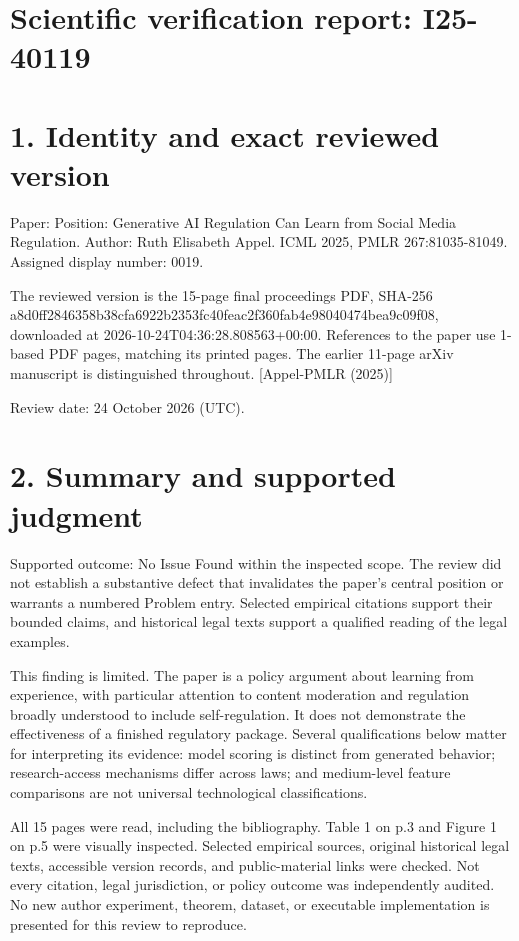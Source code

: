 \documentclass[10pt]{article}
\begin{document}
\section*{Scientific verification report: I25-40119}
\section*{1. Identity and exact reviewed version}
Paper: Position: Generative AI Regulation Can Learn from Social Media Regulation. Author: Ruth Elisabeth Appel. ICML 2025, PMLR 267:81035-81049. Assigned display number: 0019.\par
The reviewed version is the 15-page final proceedings PDF, SHA-256 a8d0ff2846358b38cfa6922b2353fc40feac2f360fab4e98040474bea9c09f08, downloaded at 2026-10-24T04:36:28.808563+00:00. References to the paper use 1-based PDF pages, matching its printed pages. The earlier 11-page arXiv manuscript is distinguished throughout. [Appel-PMLR (2025)]\par
Review date: 24 October 2026 (UTC).\par
\section*{2. Summary and supported judgment}
Supported outcome: No Issue Found within the inspected scope. The review did not establish a substantive defect that invalidates the paper’s central position or warrants a numbered Problem entry. Selected empirical citations support their bounded claims, and historical legal texts support a qualified reading of the legal examples.\par
This finding is limited. The paper is a policy argument about learning from experience, with particular attention to content moderation and regulation broadly understood to include self-regulation. It does not demonstrate the effectiveness of a finished regulatory package. Several qualifications below matter for interpreting its evidence: model scoring is distinct from generated behavior; research-access mechanisms differ across laws; and medium-level feature comparisons are not universal technological classifications.\par
All 15 pages were read, including the bibliography. Table 1 on p.3 and Figure 1 on p.5 were visually inspected. Selected empirical sources, original historical legal texts, accessible version records, and public-material links were checked. Not every citation, legal jurisdiction, or policy outcome was independently audited. No new author experiment, theorem, dataset, or executable implementation is presented for this review to reproduce.\par
\end{document}
